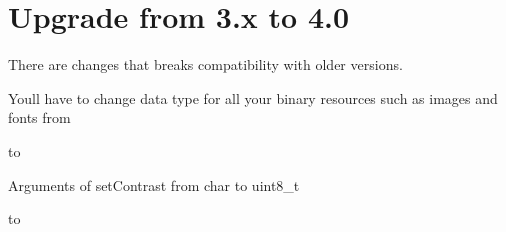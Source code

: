 \chapter{Upgrade from 3.x to 4.0}
\hypertarget{md_src_2_e_s_p8266__and___e_s_p32___o_l_e_d__driver__for___s_s_d1306__displays_2_u_p_g_r_a_d_e-4_80}{}\label{md_src_2_e_s_p8266__and___e_s_p32___o_l_e_d__driver__for___s_s_d1306__displays_2_u_p_g_r_a_d_e-4_80}
\label{md_src_2_e_s_p8266__and___e_s_p32___o_l_e_d__driver__for___s_s_d1306__displays_2_u_p_g_r_a_d_e-4_80_autotoc_md40}%
%
 There are changes that breaks compatibility with older versions.


\begin{DoxyEnumerate}
\item You\textquotesingle{}ll have to change data type for all your binary resources such as images and fonts from


\begin{DoxyCode}{0}

\end{DoxyCode}


to


\begin{DoxyCode}{0}

\end{DoxyCode}

\end{DoxyEnumerate}
\begin{DoxyEnumerate}
\item Arguments of {\ttfamily set\+Contrast} from {\ttfamily char} to {\ttfamily uint8\+\_\+t}


\begin{DoxyCode}{0}
\DoxyCodeLine{++}

\end{DoxyCode}


to


\begin{DoxyCode}{0}
\DoxyCodeLine{++}

\end{DoxyCode}
 
\end{DoxyEnumerate}
